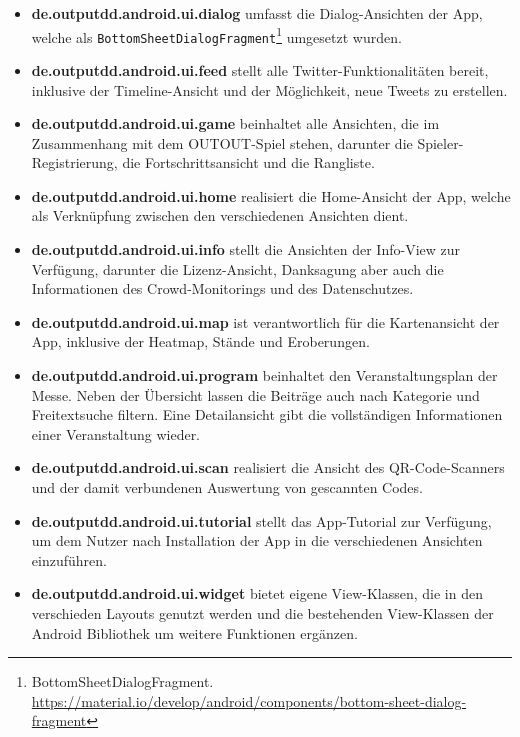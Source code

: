 \begin{itemize}
\begin{itemize}
            \item \textbf{de.outputdd.android.ui.dialog} umfasst die Dialog-Ansichten der App, welche als \texttt{BottomSheetDialogFragment}\footnote{BottomSheetDialogFragment. \newline \url{https://material.io/develop/android/components/bottom-sheet-dialog-fragment}} umgesetzt wurden.
            \item \textbf{de.outputdd.android.ui.feed} stellt alle Twitter-Funktionalitäten bereit, inklusive der Timeline-Ansicht und der Möglichkeit, neue Tweets zu erstellen.
            \item \textbf{de.outputdd.android.ui.game} beinhaltet alle Ansichten, die im Zusammenhang mit dem OUTOUT-Spiel stehen, darunter die Spieler-Registrierung, die Fortschrittsansicht und die Rangliste.
            \item \textbf{de.outputdd.android.ui.home} realisiert die Home-Ansicht der App, welche als Verknüpfung zwischen den verschiedenen Ansichten dient.
            \item \textbf{de.outputdd.android.ui.info} stellt die Ansichten der Info-View zur Verfügung, darunter die Lizenz-Ansicht, Danksagung aber auch die Informationen des Crowd-Monitorings und des Datenschutzes.
            \item \textbf{de.outputdd.android.ui.map} ist verantwortlich für die Kartenansicht der App, inklusive der Heatmap, Stände und Eroberungen.
            \item \textbf{de.outputdd.android.ui.program} beinhaltet den Veranstaltungsplan der Messe. Neben der Übersicht lassen die Beiträge auch nach Kategorie und Freitextsuche filtern. Eine Detailansicht gibt die vollständigen Informationen einer Veranstaltung wieder.
            \item \textbf{de.outputdd.android.ui.scan} realisiert die Ansicht des QR-Code-Scanners und der damit verbundenen Auswertung von gescannten Codes.
            \item \textbf{de.outputdd.android.ui.tutorial} stellt das App-Tutorial zur Verfügung, um dem Nutzer nach Installation der App in die verschiedenen Ansichten einzuführen.
            \item \textbf{de.outputdd.android.ui.widget} bietet eigene View-Klassen, die in den verschieden Layouts genutzt werden und die bestehenden View-Klassen der Android Bibliothek um weitere Funktionen ergänzen.
        \end{itemize}
\end{itemize}

